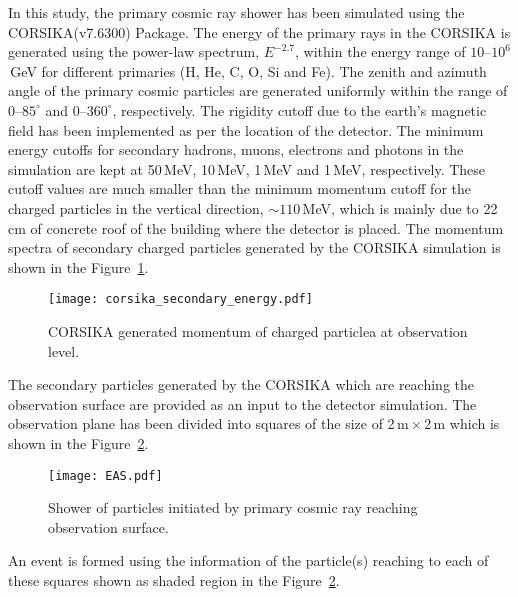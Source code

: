 In this study, the primary cosmic ray shower has been simulated using
the CORSIKA(v7.6300) Package. The energy of the primary rays in the
CORSIKA is generated using the power-law spectrum, $E^{-2.7}$, within
the energy range of \mbox{$10$--$10^{6}$\,GeV} for different primaries
(H, He, C, O, Si and Fe). The zenith and azimuth angle of the primary
cosmic particles are generated uniformly within the range of
\mbox{$0$--$85^\circ$} and \mbox{$0$--$360^\circ$}, respectively. The
rigidity cutoff due to the earth's magnetic field has been implemented
as per the location of the detector. The minimum energy cutoffs for
secondary hadrons, muons, electrons and photons in the simulation are
kept at 50\,MeV, 10\,MeV, 1\,MeV and 1\,MeV, respectively. These cutoff
values are much smaller than the minimum momentum cutoff for
the charged particles in the vertical direction,
\mbox{$\sim 110$\,MeV}, which is mainly due to 22\,cm of concrete
roof of the building where the detector is placed. The momentum
spectra of secondary charged particles generated by the CORSIKA
simulation is shown in the Figure~\ref{fig:momin}.
\begin{figure}[h]
  \centering
  \texttt{[image: corsika\_secondary\_energy.pdf]} 
  \caption{CORSIKA generated momentum of charged particlea at
    observation level.}
  \label{fig:momin}
\end{figure}

The secondary particles generated by the CORSIKA which are reaching
the observation surface are provided as an input to the detector
simulation. The observation plane has been divided
into squares of the size of 2\,m\,$\times$\,2\,m which is shown in the
Figure~\ref{fig:eas}.
\begin{figure}[h]
  \centering
  \texttt{[image: EAS.pdf]} 
  \caption{Shower of particles initiated by primary cosmic ray
    reaching observation surface.}
  \label{fig:eas}
\end{figure}
An event is formed using the information of the particle(s) reaching
to each of these squares shown as shaded region in the
Figure~\ref{fig:eas}.


